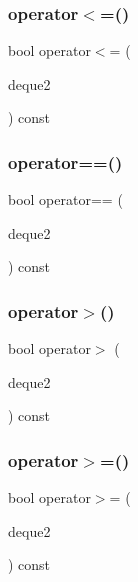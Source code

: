 \mbox{\label{classDeque_a08a801e1cca1a84e7fae799f5c12696e}} 
\subsubsection{\texorpdfstring{operator$<$=()}{operator<=()}}
{\footnotesize\ttfamily bool operator$<$= (\begin{DoxyParamCaption}\item[{const \mbox{\hyperlink{classDeque}{Deque}}$<$ Value\+Type $>$ \&}]{deque2 }\end{DoxyParamCaption}) const}

\mbox{\label{classDeque_a7c3d72e4bc4a27ebfd08adbcddbb80f8}} 
\subsubsection{\texorpdfstring{operator==()}{operator==()}}
{\footnotesize\ttfamily bool operator== (\begin{DoxyParamCaption}\item[{const \mbox{\hyperlink{classDeque}{Deque}}$<$ Value\+Type $>$ \&}]{deque2 }\end{DoxyParamCaption}) const}

\mbox{\label{classDeque_ad16a7887ef76856de7f882fb53cc8992}} 
\subsubsection{\texorpdfstring{operator$>$()}{operator>()}}
{\footnotesize\ttfamily bool operator$>$ (\begin{DoxyParamCaption}\item[{const \mbox{\hyperlink{classDeque}{Deque}}$<$ Value\+Type $>$ \&}]{deque2 }\end{DoxyParamCaption}) const}

\mbox{\label{classDeque_a033d291120793fffa944ffcc72cc947a}} 
\subsubsection{\texorpdfstring{operator$>$=()}{operator>=()}}
{\footnotesize\ttfamily bool operator$>$= (\begin{DoxyParamCaption}\item[{const \mbox{\hyperlink{classDeque}{Deque}}$<$ Value\+Type $>$ \&}]{deque2 }\end{DoxyParamCaption}) const}

